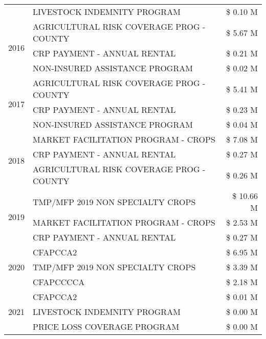 \begin{tabular}{llr}
 & LIVESTOCK INDEMNITY PROGRAM & \$ 0.10 M \\
\cline{1-3}
\multirow[t]{3}{*}{2016} & AGRICULTURAL RISK COVERAGE PROG - COUNTY & \$ 5.67 M \\
 & CRP PAYMENT - ANNUAL RENTAL & \$ 0.21 M \\
 & NON-INSURED ASSISTANCE PROGRAM & \$ 0.02 M \\
\cline{1-3}
\multirow[t]{3}{*}{2017} & AGRICULTURAL RISK COVERAGE PROG - COUNTY & \$ 5.41 M \\
 & CRP PAYMENT - ANNUAL RENTAL & \$ 0.23 M \\
 & NON-INSURED ASSISTANCE PROGRAM & \$ 0.04 M \\
\cline{1-3}
\multirow[t]{3}{*}{2018} & MARKET FACILITATION PROGRAM - CROPS & \$ 7.08 M \\
 & CRP PAYMENT - ANNUAL RENTAL & \$ 0.27 M \\
 & AGRICULTURAL RISK COVERAGE PROG - COUNTY & \$ 0.26 M \\
\cline{1-3}
\multirow[t]{3}{*}{2019} & TMP/MFP 2019 NON SPECIALTY CROPS & \$ 10.66 M \\
 & MARKET FACILITATION PROGRAM - CROPS & \$ 2.53 M \\
 & CRP PAYMENT - ANNUAL RENTAL & \$ 0.27 M \\
\cline{1-3}
\multirow[t]{3}{*}{2020} & CFAPCCA2 & \$ 6.95 M \\
 & TMP/MFP 2019 NON SPECIALTY CROPS & \$ 3.39 M \\
 & CFAPCCCCA & \$ 2.18 M \\
\cline{1-3}
\multirow[t]{3}{*}{2021} & CFAPCCA2 & \$ 0.01 M \\
 & LIVESTOCK INDEMNITY PROGRAM & \$ 0.00 M \\
 & PRICE LOSS COVERAGE PROGRAM & \$ 0.00 M \\
\cline{1-3}
\bottomrule
\end{tabular}
